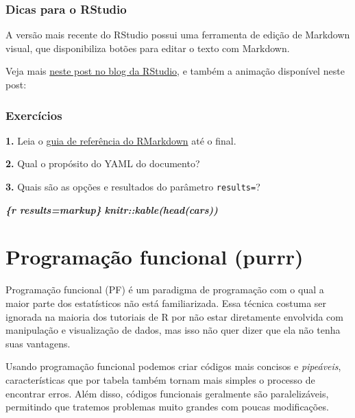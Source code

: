 \documentclass[
]{book}
\newenvironment{Shaded}{\begin{snugshade}}{\end{snugshade}}
\newcommand{\InformationTok}[1]{\textcolor[rgb]{0.56,0.35,0.01}{\textbf{\textit{#1}}}}
\begin{document}
\hypertarget{dicas-para-o-rstudio}{%
\subsection{Dicas para o RStudio}\label{dicas-para-o-rstudio}}

A versão mais recente do RStudio possui uma ferramenta de edição de Markdown visual, que disponibiliza botões para editar o texto com Markdown.

Veja mais \href{https://blog.rstudio.com/2020/09/30/rstudio-v1-4-preview-visual-markdown-editing/}{neste post no blog da RStudio}, e também a animação disponível neste post:

\hypertarget{exercicios-rmd}{%
\subsection*{Exercícios}\label{exercicios-rmd}}

\textbf{1.} Leia o \href{https://rstudio.com/wp-content/uploads/2015/03/rmarkdown-reference.pdf}{guia de referência do RMarkdown} até o final.

\textbf{2.} Qual o propósito do YAML do documento?

\textbf{3.} Quais são as opções e resultados do parâmetro \texttt{results=}?

\begin{Shaded}
\begin{Highlighting}[]
\InformationTok{\textasciigrave{}\textasciigrave{}\textasciigrave{}\{r results=\textquotesingle{}markup\textquotesingle{}\}}
\InformationTok{knitr::kable(head(cars))}
\InformationTok{\textasciigrave{}\textasciigrave{}\textasciigrave{}}
\end{Highlighting}
\end{Shaded}

\hypertarget{funcionais}{%
\chapter{Programação funcional (purrr)}\label{funcionais}}

Programação funcional (PF) é um paradigma de programação com o qual a maior parte
dos estatísticos não está familiarizada. Essa técnica costuma ser ignorada na
maioria dos tutoriais de R por não estar diretamente envolvida com manipulação e
visualização de dados, mas isso não quer dizer que ela não tenha suas vantagens.

Usando programação funcional podemos criar códigos mais concisos e \emph{pipeáveis}, características que por tabela também tornam mais simples o processo de encontrar erros. Além disso, códigos funcionais geralmente são paralelizáveis, permitindo que tratemos problemas muito grandes com poucas modificações.
\end{document}
